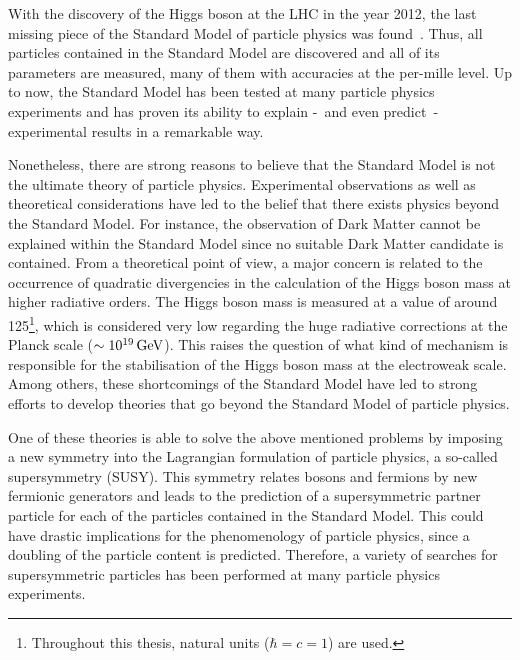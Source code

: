 \noindent With the discovery of the Higgs boson at the LHC in the year 2012, the last missing piece of the Standard Model of particle physics was found~\cite{bib:Theory:CMS:HiggsObservation,bib:Theory:Atlas:HiggsObservation}.
Thus, all particles contained in the Standard Model are discovered and all of its parameters are measured, many of them with accuracies at the per-mille level.
Up to now,  the Standard Model has been tested at many particle physics experiments and has proven its ability to explain -~and even predict~- experimental results in a remarkable way.


Nonetheless, there are strong reasons to believe that the Standard Model is not the ultimate theory of particle physics.
Experimental observations as well as theoretical considerations have led to the belief that there exists physics beyond the Standard Model.
For instance, the observation of Dark Matter cannot be explained within the Standard Model since no suitable Dark Matter candidate is contained.
From a theoretical point of view, a major concern is related to the occurrence of quadratic divergencies in the calculation of the Higgs boson mass at higher radiative orders.
The Higgs boson mass is measured at a value of around 125\gev\footnote{Throughout this thesis, natural units ($\hbar = c = 1$) are used.}, which is considered very low regarding the huge radiative corrections at the Planck scale ($\sim 10^{19}\,\text{Ge}\kern-0.06667em\text{V}$). 
This raises the question of what kind of mechanism is responsible for the stabilisation of the Higgs boson mass at the electroweak scale. 
Among others, these shortcomings of the Standard Model have led to strong efforts to develop theories that go beyond the Standard Model of particle physics. 

One of these theories is able to solve the above mentioned problems by imposing a new symmetry into the Lagrangian formulation of particle physics, a so-called supersymmetry (SUSY).
This symmetry relates bosons and fermions by new fermionic generators and leads to the prediction of a supersymmetric partner particle for each of the particles contained in the Standard Model.
This could have drastic implications for the phenomenology of particle physics, since a doubling of the particle content is predicted.
Therefore, a variety of searches for supersymmetric particles has been performed at many particle physics experiments.\\


